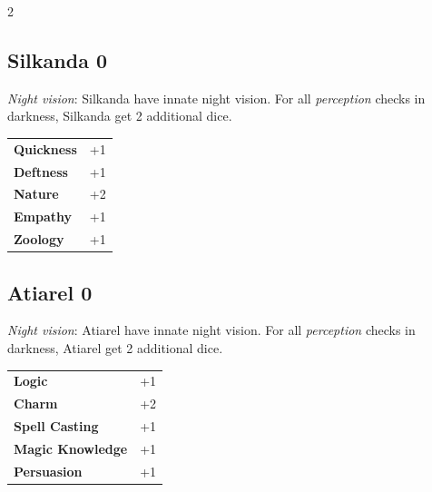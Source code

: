 \begin{multicols}{2}
\begin{tcolorbox}
\end{tcolorbox}

\begin{tcolorbox}
    \subsection*{Silkanda \hfill \small{0 }}
    \tcblower
\textit{Night vision}: Silkanda have innate night vision. For all \textit{perception} checks in darkness, Silkanda get 2 additional dice.


\vspace{3mm}

\begin{tabular}{@{}ll@{}}
    \textbf{Quickness} & +1\\
    \textbf{Deftness} & +1\\
    \textbf{Nature} & +2\\
    \textbf{Empathy} & +1\\
    \textbf{Zoology} & +1\\
\end{tabular}


\end{tcolorbox}

\begin{tcolorbox}
    \subsection*{Atiarel \hfill \small{0 }}
    \tcblower
\textit{Night vision}: Atiarel have innate night vision. For all \textit{perception} checks in darkness, Atiarel get 2 additional dice.


\vspace{3mm}

\begin{tabular}{@{}ll@{}}
    \textbf{Logic} & +1\\
    \textbf{Charm} & +2\\
    \textbf{Spell Casting} & +1\\
    \textbf{Magic Knowledge} & +1\\
    \textbf{Persuasion} & +1\\
\end{tabular}



\end{tcolorbox}
\end{multicols}
